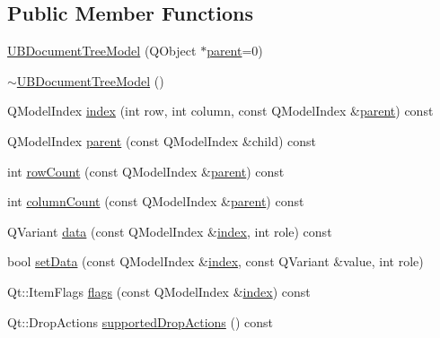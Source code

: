 \subsection*{Public Member Functions}
\begin{DoxyCompactItemize}
\item 
\hyperlink{class_u_b_document_tree_model_a6df6fc32e126b5df938c9d5543474845}{U\-B\-Document\-Tree\-Model} (Q\-Object $\ast$\hyperlink{class_u_b_document_tree_model_a6c75fc24b71d3a3d65e626f33ae02445}{parent}=0)
\item 
\hyperlink{class_u_b_document_tree_model_a2b1c18fd9eb4234185c2583ab9a2d379}{$\sim$\-U\-B\-Document\-Tree\-Model} ()
\item 
Q\-Model\-Index \hyperlink{class_u_b_document_tree_model_a482d152ef1865a960d12f7d8726133b9}{index} (int row, int column, const Q\-Model\-Index \&\hyperlink{class_u_b_document_tree_model_a6c75fc24b71d3a3d65e626f33ae02445}{parent}) const 
\item 
Q\-Model\-Index \hyperlink{class_u_b_document_tree_model_a6c75fc24b71d3a3d65e626f33ae02445}{parent} (const Q\-Model\-Index \&child) const 
\item 
int \hyperlink{class_u_b_document_tree_model_abe969ce75dea4388d4d1b56a74d9ab9f}{row\-Count} (const Q\-Model\-Index \&\hyperlink{class_u_b_document_tree_model_a6c75fc24b71d3a3d65e626f33ae02445}{parent}) const 
\item 
int \hyperlink{class_u_b_document_tree_model_af6c8296a01e1b22383ba4f567817a40a}{column\-Count} (const Q\-Model\-Index \&\hyperlink{class_u_b_document_tree_model_a6c75fc24b71d3a3d65e626f33ae02445}{parent}) const 
\item 
Q\-Variant \hyperlink{class_u_b_document_tree_model_a5be66c3a39b33101ddf1aaa4c90f0409}{data} (const Q\-Model\-Index \&\hyperlink{class_u_b_document_tree_model_a482d152ef1865a960d12f7d8726133b9}{index}, int role) const 
\item 
bool \hyperlink{class_u_b_document_tree_model_a9c3a155904cea70994155d9701056d33}{set\-Data} (const Q\-Model\-Index \&\hyperlink{class_u_b_document_tree_model_a482d152ef1865a960d12f7d8726133b9}{index}, const Q\-Variant \&value, int role)
\item 
Qt\-::\-Item\-Flags \hyperlink{class_u_b_document_tree_model_a1f1ec2d66b699260e9a62f2c0221493a}{flags} (const Q\-Model\-Index \&\hyperlink{class_u_b_document_tree_model_a482d152ef1865a960d12f7d8726133b9}{index}) const 
\item 
Qt\-::\-Drop\-Actions \hyperlink{class_u_b_document_tree_model_aaf5fd433ec637425f1d07c48b3402087}{supported\-Drop\-Actions} () const 

\end{DoxyCompactItemize}

